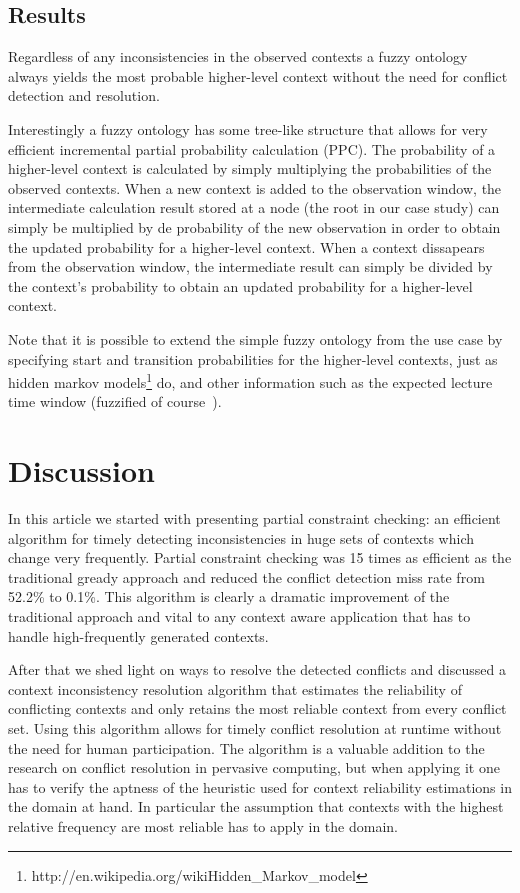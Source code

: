 \documentclass[journal]{vgtc}                %
\begin{document}
\subsection{Results}
Regardless of any inconsistencies in the observed contexts a fuzzy ontology always yields the most probable higher-level context without the need for conflict detection and resolution.

Interestingly a fuzzy ontology has some tree-like structure that allows for very efficient incremental partial probability calculation (PPC). The probability of a higher-level context is calculated by simply multiplying the probabilities of the observed contexts. When a new context is added to the observation window, the intermediate calculation result stored at a node (the root in our case study) can simply be multiplied by de probability of the new observation in order to obtain the updated probability for a higher-level context. When a context dissapears from the observation window, the intermediate result can simply be divided by the context's probability to obtain an updated probability for a higher-level context. 

Note that it is possible to extend the simple fuzzy ontology from the use case by specifying start and transition probabilities for the higher-level contexts, just as hidden markov models\footnote{http://en.wikipedia.org/wikiHidden\_Markov\_model} do, and other information such as the expected lecture time window (fuzzified of course~\cite{Buckley1995245}).

\section{Discussion}
In this article we started with presenting partial constraint checking: an efficient algorithm for timely detecting inconsistencies in huge sets of contexts which change very frequently. Partial constraint checking was 15 times as efficient as the traditional gready approach and reduced the conflict detection miss rate from 52.2\% to 0.1\%. This algorithm is clearly a dramatic improvement of the traditional approach and vital to any context aware application that has to handle high-frequently generated contexts.

After that we shed light on ways to resolve the detected conflicts and discussed a context inconsistency resolution algorithm that estimates the reliability of conflicting contexts and only retains the most reliable context from every conflict set. Using this algorithm allows for timely conflict resolution at runtime without the need for human participation. The algorithm is a valuable addition to the research on conflict resolution in pervasive computing, but when applying it one has to verify the aptness of the heuristic used for context reliability estimations in the domain at hand. In particular the assumption that contexts with the highest relative frequency are most reliable has to apply in the domain.
\end{document}
